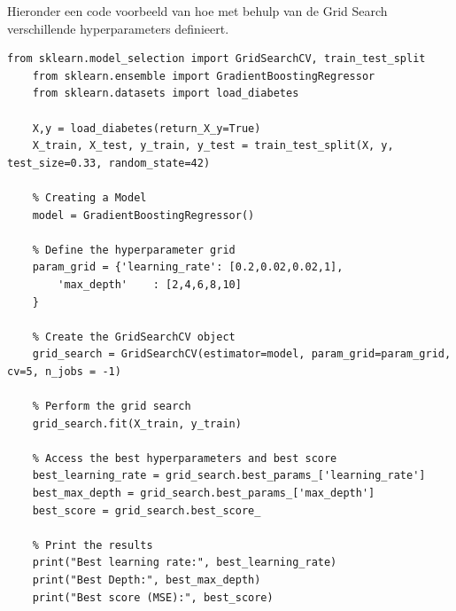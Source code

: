 Hieronder een code voorbeeld van hoe \autocite{Educative2024} met behulp van de Grid Search verschillende hyperparameters definieert.
\begin{lstlisting}[style=mystyle, caption={GridSearchCV}]
    from sklearn.model_selection import GridSearchCV, train_test_split
    from sklearn.ensemble import GradientBoostingRegressor
    from sklearn.datasets import load_diabetes
    
    X,y = load_diabetes(return_X_y=True)
    X_train, X_test, y_train, y_test = train_test_split(X, y, test_size=0.33, random_state=42)
    
    % Creating a Model
    model = GradientBoostingRegressor()
    
    % Define the hyperparameter grid
    param_grid = {'learning_rate': [0.2,0.02,0.02,1],
        'max_depth'    : [2,4,6,8,10]
    }
    
    % Create the GridSearchCV object
    grid_search = GridSearchCV(estimator=model, param_grid=param_grid, cv=5, n_jobs = -1)
    
    % Perform the grid search
    grid_search.fit(X_train, y_train)
    
    % Access the best hyperparameters and best score
    best_learning_rate = grid_search.best_params_['learning_rate']
    best_max_depth = grid_search.best_params_['max_depth']
    best_score = grid_search.best_score_
    
    % Print the results
    print("Best learning rate:", best_learning_rate)
    print("Best Depth:", best_max_depth)
    print("Best score (MSE):", best_score)
\end{lstlisting}

